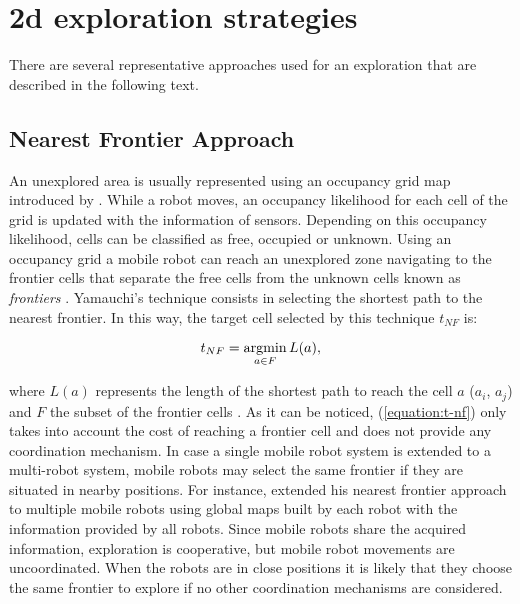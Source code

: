 \section{2d exploration strategies}

There are several representative approaches used for an exploration that are described in the following text.    



\subsection{Nearest Frontier Approach} 
An unexplored area is usually represented using an occupancy grid map introduced by \cite{Moravec}. While a robot moves, an occupancy likelihood for each cell of the grid is updated with the information of sensors. Depending on this occupancy
likelihood, cells can be classified as free, occupied or unknown. Using an occupancy grid a mobile robot can reach an unexplored zone navigating to the frontier cells that separate the free cells from the unknown cells known as \textit{frontiers} \cite{Yamauchi1997}. Yamauchi's technique consists in selecting the shortest path to the nearest frontier. In this way, the target cell selected by this technique $t_{NF}$ is:

\begin{equation}
t_{NF} = \operatorname*{argmin}_{a \in F} L(a), 
\label{equation:t-nf}
\end{equation}

where $L(a)$ represents the length of the shortest path to reach the cell $a$ ($a_{i}$, $a_{j}$) and $F$ the subset of the frontier cells \cite{Julia2012}. As it can be noticed, (\ref{equation:t-nf}) only takes into account the cost of reaching a frontier cell and does not provide any coordination mechanism. In case a single mobile robot system is extended to a multi-robot system, mobile robots may select the same frontier if they are situated in nearby positions. For instance, \cite{Yamauchi1998} extended his nearest frontier approach to multiple mobile robots using global maps built by each robot with the information provided by all robots. Since mobile robots share the acquired information, exploration is cooperative, but mobile robot movements are uncoordinated. When the robots are in close positions it is likely that they choose the same frontier to explore if no other coordination mechanisms are considered.

